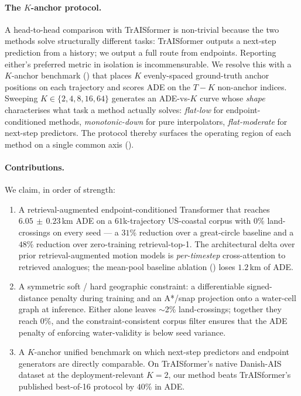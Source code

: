\documentclass[11pt]{article}
\begin{document}
\paragraph{The $K$-anchor protocol.}
A head-to-head comparison with TrAISformer is non-trivial because the
two methods solve structurally different tasks: TrAISformer outputs a
next-step prediction from a history; we output a full route from
endpoints. Reporting either's preferred metric in isolation is
incommensurable. We resolve this with a $K$-anchor benchmark
() that places $K$ evenly-spaced ground-truth anchor
positions on each trajectory and scores ADE on the $T-K$ non-anchor
indices. Sweeping $K \in \{2,4,8,16,64\}$ generates an ADE-vs-$K$ curve
whose \emph{shape} characterises what task a method actually solves:
\emph{flat-low} for endpoint-conditioned methods, \emph{monotonic-down}
for pure interpolators, \emph{flat-moderate} for next-step predictors.
The protocol thereby surfaces the operating region of each method on a
single common axis ().

\paragraph{Contributions.} We claim, in order of strength:
\begin{enumerate}[leftmargin=*,itemsep=2pt,topsep=2pt]
\item A retrieval-augmented endpoint-conditioned Transformer that
      reaches $6.05\,\pm\,0.23$\,km ADE on a $61$k-trajectory US-coastal
      corpus with $0$\% land-crossings on every seed --- a $31$\%
      reduction over a great-circle baseline and a $48$\% reduction
      over zero-training retrieval-top-1. The architectural delta over
      prior retrieval-augmented motion models is \emph{per-timestep}
      cross-attention to retrieved analogues; the mean-pool baseline
      ablation () loses $1.2$\,km of ADE.
\item A symmetric soft / hard geographic constraint: a differentiable
      signed-distance penalty during training and an A*/snap projection
      onto a water-cell graph at inference. Either alone leaves $\sim$2\%
      land-crossings; together they reach $0$\%, and the
      constraint-consistent corpus filter ensures that the ADE penalty
      of enforcing water-validity is below seed variance.
\item A $K$-anchor unified benchmark on which next-step
      predictors and endpoint generators are directly comparable. On
      TrAISformer's native Danish-AIS dataset at the deployment-relevant
      $K{=}2$, our method beats TrAISformer's published best-of-16
      protocol by $40$\% in ADE.
\end{enumerate}
\end{document}
